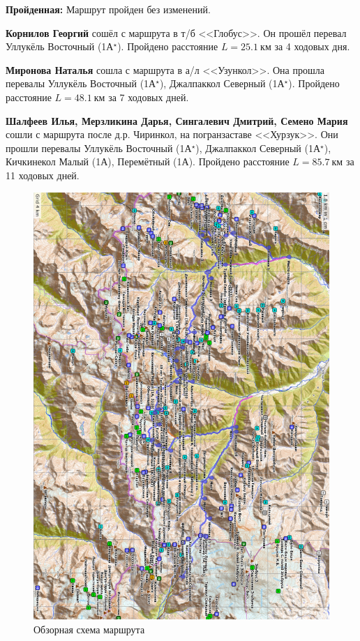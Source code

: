 \textbf{Пройденная:} Маршрут пройден без изменений.

\textbf{Корнилов Георгий} сошёл с маршрута в т/б <<Глобус>>. Он прошёл перевал Уллукёль Восточный (1А$^{\star}$). Пройдено расстояние $L=25.1~\text{км}$ за 4 ходовых дня.

\textbf{Миронова Наталья} сошла с маршрута в а/л <<Узункол>>. Она прошла перевалы Уллукёль Восточный (1А$^{\star}$), Джалпаккол Северный (1А$^{\star}$). Пройдено расстояние $L=48.
1~\text{км}$ за 7 ходовых дней.

\textbf{Шалфеев Илья, Мерзликина Дарья, Сингалевич Дмитрий, Семено Мария} сошли с маршрута после д.р. Чиринкол, на погранзаставе <<Хурзук>>. Они прошли перевалы Уллукёль Восточный (1А$^{\star}$), Джалпаккол Северный (1А$^{\star}$), Кичкинекол Малый (1А), Перемётный (1А). Пройдено расстояние $L=85.
7~\text{км}$ за 11 ходовых дней.

\begin{figure}[h!tbp]
	\centering
	\includegraphics[width=0.92\linewidth]{../pics/map}
	\caption{Обзорная схема маршрута}
\end{figure}

